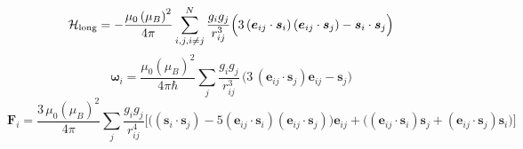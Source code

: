\documentclass[preview]{standalone}
\begin{document}
\begin{varwidth}{50in}
  \begin{equation}
    \mathcal{H}_{\rm long}= 
    -\frac{\mu_{0} \left( \mu_B\right)^2}{4\pi} 
    \sum_{i,j,i\neq j}^{N}
    \frac{g_i g_j}{r_{ij}^3}
    \Big(3 
    \left(\bm{e}_{ij}\cdot \bm{s}_{i}\right) 
    \left(\bm{e}_{ij}\cdot \bm{s}_{j}\right) 
    -\bm{s}_i\cdot\bm{s}_j \Big)
    \nonumber
  \end{equation}
  \begin{equation}
    \bm{\omega}_i = 
    \frac{\mu_0 (\mu_B)^2}{4\pi\hbar}\sum_{j}
    \frac{g_i g_j}{r_{ij}^3}
    \, \Big(
    3\,(\bm{e}_{ij}\cdot\bm{s}_{j})\bm{e}_{ij}
    -\bm{s}_{j} \Big) \nonumber
  \end{equation}
  \begin{equation}
    \bm{F}_i =
    \frac{3\, \mu_0 (\mu_B)^2}{4\pi} \sum_j
    \frac{g_i g_j}{r_{ij}^4}
    \Big[\big( (\bm{s}_i\cdot\bm{s}_j) 
    -5(\bm{e}_{ij}\cdot\bm{s}_i)
    (\bm{e}_{ij}\cdot\bm{s}_j)\big) \bm{e}_{ij}+
    \big(
    (\bm{e}_{ij}\cdot\bm{s}_i)\bm{s}_j+
    (\bm{e}_{ij}\cdot\bm{s}_j)\bm{s}_i
    \big)
    \Big]
    \nonumber
  \end{equation}
\end{varwidth}
\end{document}
